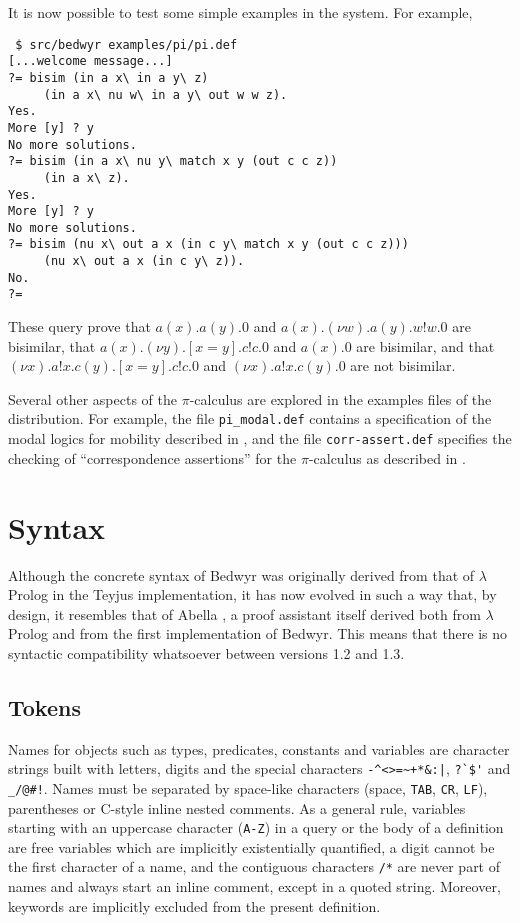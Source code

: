 \documentclass{article}
\newcommand{\lp}{$\lambda$Prolog}
\begin{document}
It is now possible to test some simple examples in the system.  For
example,
\begin{verbatim}
 $ src/bedwyr examples/pi/pi.def
[...welcome message...]
?= bisim (in a x\ in a y\ z)
     (in a x\ nu w\ in a y\ out w w z).
Yes.
More [y] ? y
No more solutions.
?= bisim (in a x\ nu y\ match x y (out c c z))
     (in a x\ z).
Yes.
More [y] ? y
No more solutions.
?= bisim (nu x\ out a x (in c y\ match x y (out c c z)))
     (nu x\ out a x (in c y\ z)).
No.
?=
\end{verbatim}
These query prove that
$a(x).a(y).0$ and $a(x).(\nu w).a(y).w!w.0$ are bisimilar,
that
$a(x).(\nu y).[x=y].c!c.0$ and $a(x).0$ are bisimilar, and that
$(\nu x).a!x.c(y).[x=y].c!c.0$ and
$(\nu x).a!x.c(y).0$ are not bisimilar.

Several other aspects of the $\pi$-calculus are explored in the examples
files of the distribution.  For example, the file \verb+pi_modal.def+
contains a specification of the modal logics for mobility described in
\cite{milner93tcs}, and the file \verb+corr-assert.def+ specifies the
checking of ``correspondence assertions'' for the $\pi$-calculus as
described in \cite{gordon03tcs}.


\appendix

\section{Syntax}

Although the concrete syntax of Bedwyr was originally derived from that
of \lp{} in the Teyjus implementation\cite{nadathur99cade}, it has
now evolved in such a way that, by design, it resembles that of Abella
\cite{abella.website}, a
proof assistant itself derived both from \lp{} and from the first
implementation of Bedwyr. This means that there is no syntactic
compatibility whatsoever between versions 1.2 and 1.3.

\subsection{Tokens}

Names for objects such as types, predicates, constants and variables are
character strings built with letters, digits and the special characters
\verb.-^<>=~+*&:|., \verb.?`$'. and \verb._/@#!.. Names must be
separated by space-like characters (space, \verb.TAB., \verb.CR.,
\verb.LF.), parentheses or C-style inline nested comments.
As a general rule, variables starting with an uppercase character
(\verb.A-Z.) in a query or the body of a definition are free variables
which are implicitly existentially quantified, a digit cannot be the
first character of a name, and the contiguous characters \verb./*. are
never part of names and always start an inline comment, except in a
quoted string.
Moreover, keywords are implicitly excluded from the present definition.
\end{document}
